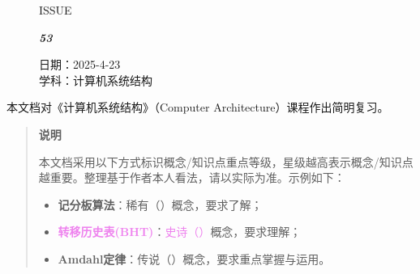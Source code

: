 \documentclass[UTF8]{ctexart}
\newcommand\Black[1]{\textcolor[gray]{0.3}{#1}}
\newcommand\Brown[1]{\textcolor[HTML]{998A4E}{#1}}
\newcommand\IssueNumber{53}
\newcommand\Date{2025-4-23}
\newcommand\Subject{计算机系统结构}
\begin{document}
\begin{figure}[H]
\hspace{1cm}
\begin{minipage}[t]{0.3\textwidth}
\centering
    \Brown{\Genshin ISSUE}

    \vspace{-0.6cm}
    \Huge \Issue\slshape\bfseries\Black{\IssueNumber}
\end{minipage}
\hfill
\begin{minipage}[t]{0.35\textwidth}
\centering
    \Brown{日期：\Date} \\
\vspace{-0.1cm}
    \Brown{学科：\Subject} \\
\end{minipage}
\hspace{0.8cm}
\end{figure}

{\centering\color{darkcyan}本文档对《计算机系统结构》（Computer Architecture）课程作出简明复习。}

\begin{quote}\small
\begin{center}
    \bfseries 说\quad 明
\end{center}

本文档采用以下方式标识概念/知识点重点等级，星级越高表示概念/知识点越重要。整理基于作者本人看法，请以实际为准。示例如下：
\begin{itemize}
    \item \colorbox{cyan!30}{\textcolor{cyan!40!black}{\bfseries 记分板算法}}：\textcolor{cyan!40!black}{稀有（）}概念，要求了解；
    \item \colorbox{violet!15}{\textcolor{violet}{\bfseries 转移历史表(BHT)}}：\textcolor{violet}{史诗（）}概念，要求理解；
    \item \colorbox{orange!30}{\textcolor{orange!60!black}{\bfseries Amdahl定律}}：\textcolor{orange!60!black}{传说（）}概念，要求重点掌握与运用。
\end{itemize}
\end{quote}
\end{document}
